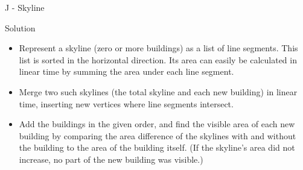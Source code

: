 \renewcommand{\insertshortauthor}{Problem Author: Jimmy M{\aa}rdell}
\begin{frame}{J - Skyline}

\begin{block}{Solution}
  \begin{itemize}
    \item Represent a skyline (zero or more buildings) as a list of line segments. This list is sorted in the horizontal direction. Its area can easily be calculated in linear time by summing the area under each line segment. 
	\item Merge two such skylines (the total skyline and each new building) in linear time, inserting new vertices where line segments intersect. 
	\item Add the buildings in the given order, and find the visible area of each new building by comparing the area difference of the skylines with and without the building to the area of the building itself. (If the skyline's area did not increase, no part of the new building was visible.)
  \end{itemize}
\end{block}

\end{frame}
